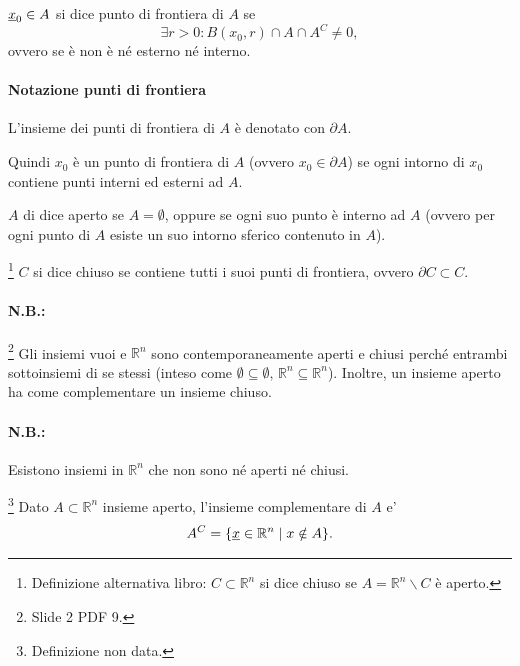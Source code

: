 \begin{definition}
    $\uline x_0\in A$ si dice punto di frontiera di $A$ se
    \begin{equation*}
        \exists r>0 \colon B(x_0,r)\cap A \cap A^C \neq 0,
    \end{equation*}
    ovvero se è non è né esterno né interno.
\end{definition}

\paragraph{Notazione punti di frontiera} L'insieme dei punti di frontiera di $A$ è denotato con $\partial A$.

Quindi $x_0$ è un punto di frontiera di $A$ (ovvero $x_0\in\partial A$) se ogni intorno di $x_0$ contiene punti interni ed esterni ad $A$.

\begin{definition}\label{def:insieme_aperto}
    $A$ di dice aperto se $A=\emptyset$, oppure se ogni suo punto è interno ad $A$ (ovvero per ogni punto di $A$ esiste un suo intorno sferico contenuto in $A$).
\end{definition}

\begin{definition}\footnote{Definizione alternativa libro: $C\subset\mathbb R^n$ si dice chiuso se $A=\mathbb R^n\backslash C$ è aperto.}
    $C$ si dice chiuso se contiene tutti i suoi punti di frontiera, ovvero $\partial C\subset C$.
\end{definition}

\paragraph{N.B.:}\footnote{Slide 2 PDF 9.} Gli insiemi vuoi e $\mathbb R^n$ sono contemporaneamente aperti e chiusi perché entrambi sottoinsiemi di se stessi (inteso come $\emptyset\subseteq\emptyset,\, \mathbb R^n\subseteq\mathbb R^n$). Inoltre, un insieme aperto ha come complementare un insieme chiuso.

\paragraph{N.B.:} Esistono insiemi in $\mathbb R^n$ che non sono né aperti né chiusi.

\begin{definition}\footnote{Definizione non data.}
    Dato $A\subset\mathbb R^n$ insieme aperto, l'insieme complementare di $A$ e'
    \begin{equation*}
        A^C=\{\uline x\in\mathbb R^n\;|\; x\notin A\}.
    \end{equation*}
\end{definition}

